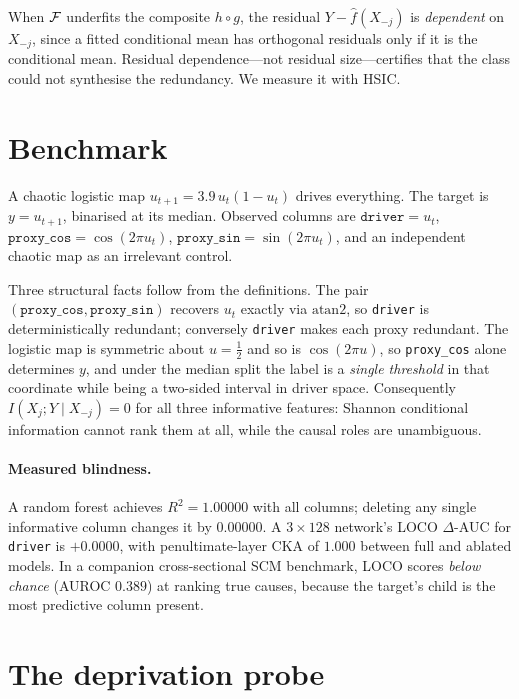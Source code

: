 \begin{remark}
When $\mathcal{F}$ underfits the composite $h \circ g$, the residual
$Y - \hat f(X_{-j})$ is \emph{dependent} on $X_{-j}$, since a fitted conditional
mean has orthogonal residuals only if it is the conditional mean. Residual
dependence---not residual size---certifies that the class could not synthesise
the redundancy. We measure it with HSIC.
\end{remark}

\section{Benchmark}\label{sec:benchmark}

A chaotic logistic map $u_{t+1} = 3.9\,u_t(1-u_t)$ drives everything. The target
is $y = u_{t+1}$, binarised at its median. Observed columns are
$\texttt{driver} = u_t$, $\texttt{proxy\_cos} = \cos(2\pi u_t)$,
$\texttt{proxy\_sin} = \sin(2\pi u_t)$, and an independent chaotic map as an
irrelevant control.

Three structural facts follow from the definitions. The pair
$(\texttt{proxy\_cos}, \texttt{proxy\_sin})$ recovers $u_t$ exactly via
$\mathrm{atan2}$, so \texttt{driver} is deterministically redundant; conversely
\texttt{driver} makes each proxy redundant. The logistic map is symmetric about
$u = \tfrac12$ and so is $\cos(2\pi u)$, so \texttt{proxy\_cos} alone determines
$y$, and under the median split the label is a \emph{single threshold} in that
coordinate while being a two-sided interval in driver space. Consequently
$I(X_j;Y\mid X_{-j}) = 0$ for all three informative features: Shannon
conditional information cannot rank them at all, while the causal roles are
unambiguous.

\paragraph{Measured blindness.} A random forest achieves $R^2 = 1.00000$ with
all columns; deleting any single informative column changes it by $0.00000$. A
$3\times128$ network's LOCO $\Delta$-AUC for \texttt{driver} is $+0.0000$, with
penultimate-layer CKA of $1.000$ between full and ablated models. In a companion
cross-sectional SCM benchmark, LOCO scores \emph{below chance} (AUROC $0.389$)
at ranking true causes, because the target's child is the most predictive column
present.

\section{The deprivation probe}\label{sec:probe}

